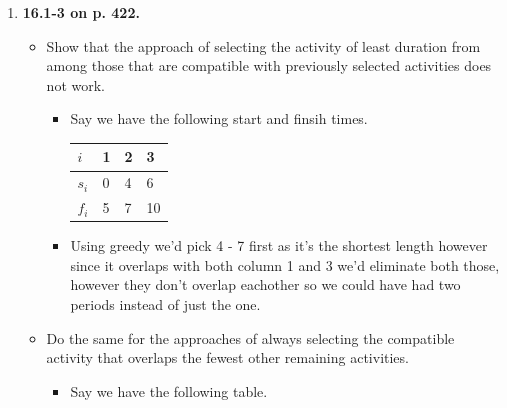 \documentclass{article}
\begin{document}
\begin{enumerate}
    \item \textbf{16.1-3 on p. 422.}
    
    \begin{itemize}
      \item Show that the approach of selecting the activity of least duration from among those that are compatible with previously selected activities does not work.
      \begin{itemize}
        \item Say we have the following start and finsih times.
          \begin{table}[H]
            \centering
            \begin{tabular}{|l|lll}
            \hline
            $i$   & \multicolumn{1}{l|}{1} & \multicolumn{1}{l|}{2} & \multicolumn{1}{l|}{3} \\ \hline
            $s_i$ & 0                      & 4                      & 6                      \\ \cline{1-1}
            $f_i$ & 5                      & 7                      & 10                     \\ \cline{1-1}
            \end{tabular}
          \end{table}
        \item Using greedy we'd pick 4 - 7 first as it's the shortest length however since it overlaps with both column 1 and 3 we'd eliminate both those, however they don't overlap eachother so we could have had two periods instead of just the one.
      \end{itemize}
      \item Do the same for the approaches of always selecting the compatible activity that overlaps the fewest other remaining activities.
      \begin{itemize}
        \item Say we have the following table.
        

\end{itemize}
\end{itemize}
\end{enumerate}
\end{document}
